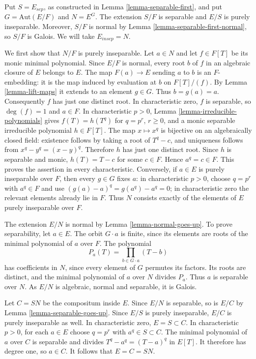 Put $S = E_{sep}$, as constructed in Lemma \ref{lemma-separable-first},
and put $G = \text{Aut}(E/F)$ and $N = E^G$.
The extension $S/F$ is separable and $E/S$ is purely inseparable.
Moreover, $S/F$ is normal by Lemma \ref{lemma-separable-first-normal},
so $S/F$ is Galois. We will take $E_{insep} = N$.

\medskip\noindent
We first show that $N/F$ is purely inseparable. Let $a \in N$ and let
$f \in F[T]$ be its monic minimal polynomial. Since $E/F$ is normal,
every root $b$ of $f$ in an algebraic closure of $E$ belongs to $E$.
The map $F(a) \to E$ sending $a$ to $b$ is an $F$-embedding:
it is the map induced by evaluation at $b$ on $F[T]/(f)$.
By Lemma \ref{lemma-lift-maps} it extends to an element $g \in G$.
Thus $b = g(a) = a$. Consequently $f$ has just one distinct root.
In characteristic zero, $f$ is separable, so $\deg(f) = 1$ and $a \in F$.
In characteristic $p > 0$, Lemma \ref{lemma-irreducible-polynomials}
gives $f(T) = h(T^q)$ for $q = p^r$, $r \geq 0$, and a monic
separable irreducible polynomial $h \in F[T]$.
The map $x \mapsto x^q$ is bijective on an algebraically closed field:
existence follows by taking a root of $T^q-c$, and uniqueness follows
from $x^q-y^q=(x-y)^q$. Therefore $h$ has just one distinct root.
Since $h$ is separable and monic, $h(T)=T-c$ for some $c \in F$.
Hence $a^q=c \in F$. This proves the assertion in every characteristic.
Conversely, if $a \in E$ is purely inseparable over $F$, then every
$g \in G$ fixes $a$: in characteristic $p>0$, choose $q=p^r$ with
$a^q\in F$ and use $(g(a)-a)^q=g(a^q)-a^q=0$; in characteristic
zero the relevant elements already lie in $F$.
Thus $N$ consists exactly of the elements of $E$ purely inseparable
over $F$.

\medskip\noindent
The extension $E/N$ is normal by Lemma \ref{lemma-normal-goes-up}.
To prove separability, let $a \in E$. The orbit $G\cdot a$ is finite,
since its elements are roots of the minimal polynomial of $a$ over $F$.
The polynomial
$$
P_a(T)=\prod_{b\in G\cdot a}(T-b)
$$
has coefficients in $N$, since every element of $G$ permutes its factors.
Its roots are distinct, and the minimal polynomial of $a$ over $N$
divides $P_a$. Thus $a$ is separable over $N$. As $E/N$ is algebraic,
normal and separable, it is Galois.

\medskip\noindent
Let $C=SN$ be the compositum inside $E$. Since $E/N$ is separable,
so is $E/C$ by Lemma \ref{lemma-separable-goes-up}. Since $E/S$
is purely inseparable, $E/C$ is purely inseparable as well.
In characteristic zero, $E=S\subset C$. In characteristic $p>0$,
for each $a\in E$ choose $q=p^r$ with $a^q\in S\subset C$.
The minimal polynomial of $a$ over $C$ is separable and divides
$T^q-a^q=(T-a)^q$ in $E[T]$. It therefore has degree one, so $a\in C$.
It follows that $E=C=SN$.

